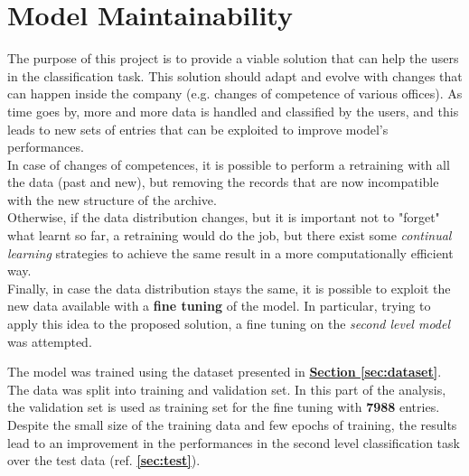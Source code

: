 \documentclass[12pt]{article}
\begin{document}
\section{Model Maintainability}
The purpose of this project is to provide a viable solution that can help the users in the classification task. This solution should adapt and evolve with changes that can happen inside the company (e.g. changes of competence of various offices). As time goes by, more and more data is handled and classified by the users, and this leads to new sets of entries that can be exploited to improve model's performances.\\
In case of changes of competences, it is possible to perform a retraining with all the data (past and new), but removing the records that are now incompatible with the new structure of the archive.\\
Otherwise, if the data distribution changes, but it is important not to "forget" what learnt so far, a retraining would do the job, but there exist some \textit{continual learning} strategies to achieve the same result in a more computationally efficient way.\\
Finally, in case the data distribution stays the same, it is possible to exploit the new data available with a \textbf{fine tuning} of the model.
In particular, trying to apply this idea to the proposed solution, a fine tuning on the \textit{second level model} was attempted.

The model was trained using the dataset presented in \hyperref[sec:dataset]{\textbf{Section \ref{sec:dataset}}}. The data was split into training and validation set. In this part of the analysis, the validation set is used as training set for the fine tuning with \textbf{7988} entries. Despite the small size of the training data and few epochs of training, the results lead to an improvement in the performances in the second level classification task over the test data (ref. \textbf{\ref{sec:test}}).
\end{document}

